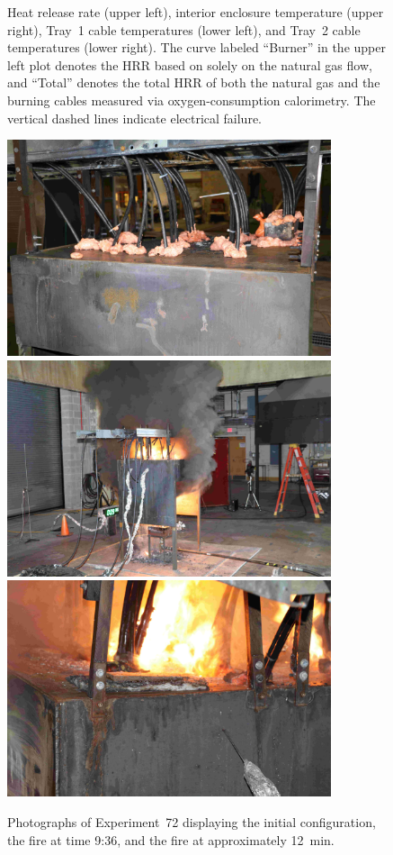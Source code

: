 \begin{figure}[H]
\caption[HRR and temperatures of Experiment 72]{Heat release rate (upper left), interior enclosure temperature (upper right), Tray~1 cable temperatures (lower left), and Tray~2 cable temperatures (lower right). The curve labeled ``Burner'' in the upper left plot denotes the HRR based on solely on the natural gas flow, and ``Total'' denotes the total HRR of both the natural gas and the burning cables measured via oxygen-consumption calorimetry. The vertical dashed lines indicate electrical failure.}
\label{fig:Test_72}
\end{figure}

\begin{figure}[p]
\centering
\includegraphics[height=2.50in]{../FIGURES/Test_72_Photo_1} \\ \vspace{0.1in}
\includegraphics[height=2.50in]{../FIGURES/Test_72_Photo_2} \\ \vspace{0.1in}
\includegraphics[height=2.50in]{../FIGURES/Test_72_Photo_3}
\caption[Photographs of Experiment~72]{Photographs of Experiment~72 displaying the initial configuration, the fire at time 9:36, and the fire at approximately 12~min.}
\label{fig:Test_72_photos}
\end{figure}


